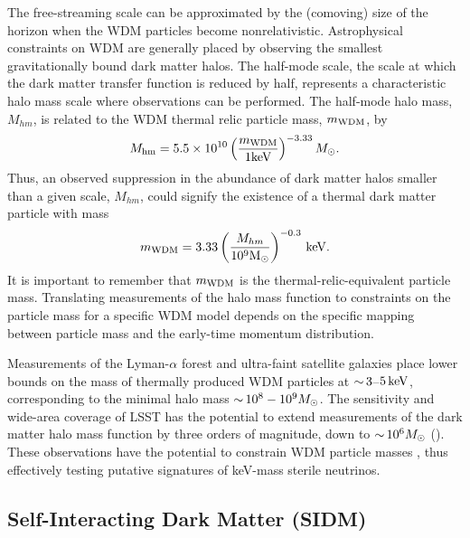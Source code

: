 The free-streaming scale can be approximated by the (comoving) size of the horizon when the WDM particles become nonrelativistic. 
Astrophysical constraints on WDM are generally placed by observing the smallest gravitationally bound dark matter halos.  
The half-mode scale, the scale at which the dark matter transfer function is reduced by half, represents a characteristic halo mass scale where observations can be performed. 
The half-mode halo mass, $M_{hm}$, is related to the WDM thermal relic particle mass, $m_{\rm WDM}$, by \citep[\eg][]{schneider2012,Bullock:2017xww}
\begin{equation} \label{eqn:Mhm}
    M_{\rm hm} = 5.5 \times 10^{10} \left( \frac{m_{\rm WDM}}{1 {\rm keV}} \right)^{-3.33} M_\odot.
\end{equation}
Thus, an observed suppression in the abundance of dark matter halos smaller than a given scale, $M_{hm}$, could signify the existence of a thermal dark matter particle with mass
\begin{equation} \label{eqn:mWDM}
    m_{\rm WDM} =  3.33 \left(\frac{M_{hm}}{10^{9} {\rm M_\odot}} \right)^{-0.3} \mathrm{\,keV}.
\end{equation}
It is important to remember that $m_{\rm WDM}$ is the thermal-relic-equivalent particle mass. Translating measurements of the halo mass function to constraints on the particle mass for a specific WDM model depends on the specific mapping between particle mass and the early-time momentum distribution.

Measurements of the Lyman-$\alpha$ forest \citep[\eg][]{Viel:2013,2017PhRvD..96b3522I} and ultra-faint satellite galaxies \citep[\eg][]{Jethwa:2018,Kim:2017iwr,Nadler:2018}  place lower bounds on the mass of thermally produced WDM particles at $ {\sim}\, 3$--$5\mathrm{\,keV}$, corresponding to the minimal halo mass $ {\sim}\, 10^8-10^9 M_\odot$.
The sensitivity and wide-area coverage of LSST has the potential to extend measurements of the dark matter halo mass function by three orders of magnitude, down to $ {\sim}\, 10^6 M_\odot$ (). 
These observations have the potential to constrain WDM particle masses , thus effectively testing putative signatures of keV-mass sterile neutrinos.


\subsection{Self-Interacting Dark Matter (SIDM)}
\label{sec:sidm}

